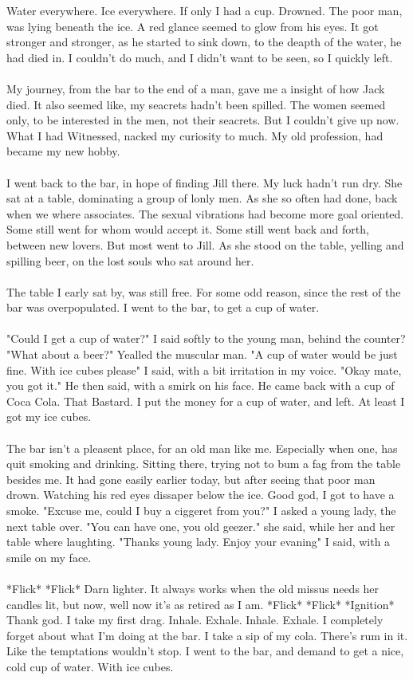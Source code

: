\documentclass[]{article}
\begin{document}
Water everywhere. Ice everywhere. If only I had a cup. Drowned. The poor man, was lying beneath the ice. A red glance seemed to glow from his eyes. It got stronger and stronger, as he started to sink down, to the deapth of the water, he had died in. I couldn't do much, and I didn't want to be seen, so I quickly left.
\\ \\
My journey, from the bar to the end of a man, gave me a insight of how Jack died. It also seemed like, my seacrets hadn't been spilled. The women seemed only, to be interested in the men, not their seacrets. But I couldn't give up now. What I had Witnessed, nacked my curiosity to much. My old profession, had became my new hobby. 
\\ \\
I went back to the bar, in hope of finding Jill there. My luck hadn't run dry. She sat at a table, dominating a group of lonly men. As she so often had done, back when we where associates. The sexual vibrations had become more goal oriented. Some still went for whom would accept it. Some still went back and forth, between new lovers. But most went to Jill. As she stood on the table, yelling and spilling beer, on the lost souls who sat around her.
\\ \\
The table I early sat by, was still free. For some odd reason, since the rest of the bar was overpopulated. I went to the bar, to get a cup of water. 
\\ \\
"Could I get a cup of water?" I said softly to the young man, behind the counter?
"What about a beer?" Yealled the muscular man.
"A cup of water would be just fine. With ice cubes please" I said, with a bit irritation in my voice. 
"Okay mate, you got it." He then said, with a smirk on his face. 
He came back with a cup of Coca Cola. That Bastard. I put the money for a cup of water, and left. At least I got my ice cubes.
\\ \\
The bar isn't a pleasent place, for an old man like me. Especially when one, has quit smoking and drinking. Sitting there, trying not to bum a fag from the table besides me. It had gone easily earlier today, but after seeing that poor man drown. Watching his red eyes dissaper below the ice. Good god, I got to have a smoke. "Excuse me, could I buy a ciggeret from you?" I asked a young lady, the next table over. "You can have one, you old geezer." she said, while her and her table where laughting. "Thanks young lady. Enjoy your evaning" I said, with a smile on my face. 
\\ \\
*Flick* *Flick* Darn lighter. It always works when the old missus needs her candles lit, but now, well now it's as retired as I am. *Flick* *Flick* *Ignition* Thank god. I take my first drag. Inhale. Exhale. Inhale. Exhale. I completely forget about what I'm doing at the bar. I take a sip of my cola. There's rum in it. Like the temptations wouldn't stop. I went to the bar, and demand to get a nice, cold cup of water. With ice cubes.
\end{document}
